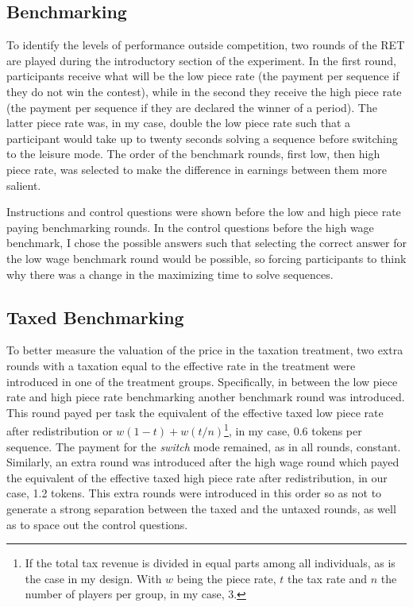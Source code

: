     
    \subsection{Benchmarking}
    
    To identify the levels of performance outside competition, two rounds of the RET are played during the introductory section of the experiment. In the first round, participants receive what will be the low piece rate (the payment per sequence if they do not win the contest), while in the second they receive the high piece rate (the payment per sequence if they are declared the winner of a period). The latter piece rate was, in my case, double the low piece rate such that a participant would take up to twenty seconds solving a sequence before switching to the leisure mode. The order of the benchmark rounds, first low, then high piece rate, was selected to make the difference in earnings between them more salient.
    
    Instructions and control questions were shown before the low and high piece rate paying benchmarking rounds. In the control questions before the high wage benchmark, I chose the possible answers such that selecting the correct answer for the low wage benchmark round would be possible, so forcing participants to think why there was a change in the maximizing time to solve sequences.
    
    \subsection{Taxed Benchmarking}
    \label{ss:tax_bench}
    
    To better measure the valuation of the price in the taxation treatment, two extra rounds with a taxation equal to the effective rate in the treatment were introduced in one of the treatment groups. Specifically, in between the low piece rate and high piece rate benchmarking another benchmark round was introduced. This round payed per task the equivalent of the effective taxed low piece rate after redistribution or $w(1-t)+ w(t/n)$\footnote{If the total tax revenue is divided in equal parts among all individuals, as is the case in my design. With $w$ being the piece rate, $t$ the tax rate and $n$ the number of players per group, in my case, 3.}, in my case, 0.6 tokens per sequence. The payment for the \textit{switch} mode remained, as in all rounds, constant. Similarly, an extra round was introduced after the high wage round which payed the equivalent of the effective taxed high piece rate after redistribution, in our case, 1.2 tokens. This extra rounds were introduced in this order so as not to generate a strong separation between the taxed and the untaxed rounds, as well as to space out the control questions. \\ 
    

